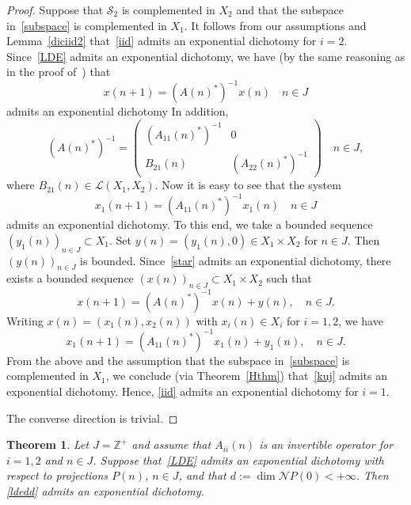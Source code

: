 \documentclass[11pt,reqno,a4paper]{amsart}
\theoremstyle{plain}
\numberwithin{equation}{section}
\newtheorem{theorem}{Theorem}
\theoremstyle{remark}
\begin{document}
\begin{proof}
Suppose that $\mathcal S_2$ is complemented in $X_2$ and that the subspace in~\eqref{subspace} is complemented in $X_1$.
It follows from our assumptions and Lemma~\ref{diciid2} that~\eqref{iid} admits an exponential dichotomy for $i=2$. 
Since~\eqref{LDE} admits an exponential dichotomy, we have (by the same reasoning as in the proof of~\cite[Lemma 1]{P}) that  
\begin{equation}\label{star}
x(n+1)=(A(n)^*)^{-1} x(n) \quad n\in J
\end{equation}
admits an exponential dichotomy
In addition, 
\begin{equation}\label{501coeff}
(A(n)^*)^{-1} =\begin{pmatrix}
(A_{11}(n)^*)^{-1} & 0\\
B_{21}(n) & (A_{22}(n)^*)^{-1}
\end{pmatrix} \quad n\in J,
\end{equation}
where $B_{21}(n)\in \mathcal L(X_1, X_2)$.
Now it is easy to see that the system
\begin{equation}\label{kuj}
x_1(n+1)=(A_{11}(n)^*)^{-1} x_1(n) \quad n\in J
\end{equation}
admits an exponential dichotomy. To this end, we take a bounded sequence $(y_1(n))_{n\in J}\subset X_1$. Set $y(n)=(y_1(n), 0)\in X_1\times X_2$ for $n\in J$. Then $(y(n))_{n\in J}$ is bounded. Since~\eqref{star} admits an exponential dichotomy, there exists a bounded sequence $(x(n))_{n\in J}\subset X_1\times X_2$ such that 
\[
x(n+1)=(A(n)^*)^{-1}x(n)+y (n), \quad n\in J.
\]
Writing $x(n)=(x_1(n), x_2(n))$ with $x_i(n)\in X_i$ for $i=1, 2$, we have 
\[
x_1(n+1)=(A_{11}(n)^*)^{-1}x_1(n)+y_1(n), \quad n\in J.
\]
From the above and the assumption that the subspace in~\eqref{subspace} is complemented in $X_1$, we conclude (via Theorem~\ref{Hthm}) that~\eqref{kuj} admits an exponential dichotomy. Hence, \eqref{iid} admits an exponential dichotomy for $i=1$.

The converse direction is trivial.
\end{proof} 


\begin{theorem}\label{515thm}
Let $J=\mathbb Z^+$ and assume that $A_{ii}(n)$ is an invertible operator for $i=1, 2$ and $n\in J$. Suppose that~\eqref{LDE} admits an exponential dichotomy with respect to projections $P(n)$, $n\in J$, and that $d:=\dim \mathcal NP(0)<+\infty$. Then \eqref{ldedd} admits an exponential dichotomy.

\end{theorem}
\end{document}
